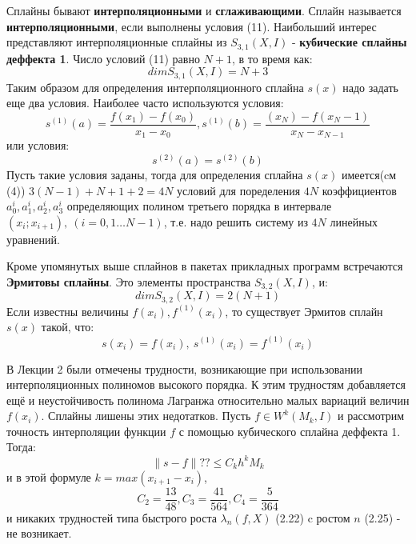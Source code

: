 Сплайны бывают \textbf{интерполяционными} и \textbf{сглаживающими}. Сплайн называется \textbf{интерполяционными}, если выполнены условия (11).
Наибольший интерес представляют интерполяционные сплайны из $S_{3,1}(X,I)$ - \textbf{кубические сплайны деффекта 1}. Число условий (11) равно $N+1$, в то время как:
\begin{equation}
dim  S_{3,1}(X,I) = N+3
\end{equation}
Таким образом для определения интерполяционного сплайна $s(x)$ надо задать еще два условия. Наиболее часто используются условия:
\begin{equation}
s^{( 1) }(a) =\dfrac{f\left( x_{1}\right) -f\left( x_{0}\right) }{x_{1}-x_{0}},s^{\left( 1\right) }\left( b\right) =\dfrac{\left( x_{N}\right)-f( x_{N}-1)}{x_{N}-x_{N-1}}
\end{equation}
или условия:
\begin{equation}
s^{(2) }(a) =s^{(2) }(b) 
\end{equation}
Пусть такие условия заданы, тогда для определения сплайна $s(x)$ имеется(cм (4)) $3(N-1)+N+1+2=4N$ условий для поределения $4N$ коэффициентов $a^i_0,a^i_1,a^i_2,a^i_3$ определяющих полином третьего порядка в интервале $(x_i;x_{i+1}), \ (i=0,1\ldots N-1)$, т.е. надо решить систему из $4N$ линейных уравнений. 

Кроме упомянутых выше сплайнов в пакетах прикладных программ встречаются \textbf{Эрмитовы сплайны}. Это элементы пространства $S_{3,2}(X,I)$, и:
\begin{equation}
dim  S_{3,2}(X,I) = 2(N+1)
\end{equation}
Если известны величины $f(x_i),f^{(1)}(x_i)$, то существует Эрмитов сплайн $s(x)$ такой, что:
\begin{equation}
s(x_i)=f(x_i), \ s^{(1)}(x_i)=f^{(1)}(x_i)
\end{equation}

В Лекции 2 были отмечены трудности, возникающие при использовании интерполяционных полиномов высокого порядка. К этим трудностям добавляется ещё и неустойчивость полинома Лагранжа относительно малых вариаций величин $f(x_i)$.
Сплайны лишены этих недотатков. Пусть $f\in W^k(M_k,I)$ и рассмотрим точность интерполяции функции $f$ с помощью кубического сплайна деффекта 1. Тогда:
\begin{equation}
\parallel s-f\parallel ?? \leq C_k h^k M_k
\end{equation}
и в этой формуле $k=max(x_{i+1}-x_i)$,
\begin{equation}
C_{2}=\dfrac{13}{48},C_{3}=\dfrac{41}{564},C_{4}=\dfrac{5}{364}
\end{equation}
и никаких трудностей типа быстрого роста $\lambda_n(f,X)$ (2.22) c ростом $n$ (2.25) - не возникает.

